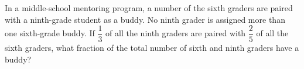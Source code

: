In a middle-school mentoring program, a number of the sixth graders are paired with a ninth-grade student as a buddy. No ninth grader is assigned more than one sixth-grade buddy. If $\dfrac13$ of all the ninth graders are paired with $\dfrac25$ of all the sixth graders, what fraction of the total number of sixth and ninth graders have a buddy?
